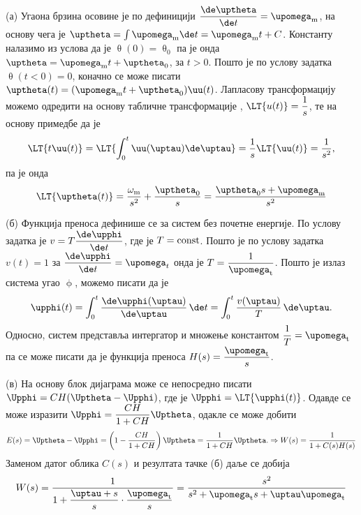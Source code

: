 \RESENJE 
(а) Угаона брзина осовине је по дефиницији $\dfrac{\de \uptheta}{\de t} = \upomega_{\rm m}$, на основу чега је 
$\uptheta = \int \upomega_{\rm m} \de t = \upomega_{\rm m} t + C$. Константу налазимо из услова да је 
$\uptheta(0) = \uptheta_0$ па је онда $\uptheta = \upomega_{\rm m} t + \uptheta_0$, за $t > 0$. Пошто је по услову
задатка $\uptheta(t < 0) = 0$, коначно се може писати 
$\uptheta(t) = (\upomega_{\rm m} t + \uptheta_0) \uu(t)$. Лапласову трансформацију можемо одредити на основу табличне 
трансформације , $\LT{u(t)} = \dfrac{1}{s}$, те на основу примедбе да је 
\begin{eqnarray}
    \LT{t \uu(t)} = \LT{ \int_0^{t} \uu(\uptau) \de \uptau} = \dfrac{1}{s} \LT{\uu(t)} = \dfrac{1}{s^2},
\end{eqnarray}
па је онда 
\begin{eqnarray}
    \LT{\uptheta(t)} = \dfrac{\omega_{\rm m}}{s^2} + \dfrac{\uptheta_0}{s} = \dfrac{\uptheta_0 s + \upomega_{\rm m}}{s^2}
\end{eqnarray}

(б) Функција преноса дефинише се за систем без почетне енергије. По услову задатка је  $v = T \dfrac{\de \upphi}{\de t}$, где је  
$T = {\rm const}$. Пошто је по услову задатка $v(t) = 1$ за $\dfrac{\de \upphi}{\de t} = \upomega_t$ онда је 
$T = \dfrac{1}{\upomega_{\rm t}}$. Пошто је излаз система угао $\upphi$, можемо писати да је 
\begin{equation}
    \upphi(t) = \int_{0}^{t} \dfrac{\de \upphi(\uptau)}{\de \uptau} \, \de t 
              = \int_{0}^{t} \dfrac{v(\uptau)}{T} \, \de \uptau.
\end{equation}
Односно, систем представља интергатор и множење константом $\dfrac{1}{T} = \upomega_{\rm t}$ 
па се може писати да је функција преноса $H(s) = \dfrac{\upomega_{\rm t}}{s}$.

(в) На основу блок дијаграма може се непосредно писати 
$\Upphi = CH( \Uptheta - \Upphi )$, где је $\Upphi = \LT{\upphi(t)}$. Одавде се може изразити 
$\Upphi = \dfrac{CH}{1 + CH} \Uptheta$, одакле се може добити 
\begin{eqnarray}
    E(s) = \Uptheta - \Upphi = 
        \left(
           1 - \dfrac{CH}{1 + CH} 
        \right) \Uptheta
         = \dfrac{1}{1 + CH} \Uptheta. \Rightarrow W(s) = \dfrac{1}{1 + C(s)H(s)}
\end{eqnarray}
Заменом датог облика $C(s)$ и резултата тачке (б) даље се добија 
\begin{eqnarray}
    W(s) = \dfrac{1}{1 + 
    \dfrac{\uptau + s}{s} \cdot \dfrac{\upomega_{\rm t}}{s}
    }
    = \dfrac{s^2}{s^2 + \upomega_{\rm t}s + \uptau \upomega_{\rm t} }
\end{eqnarray}

